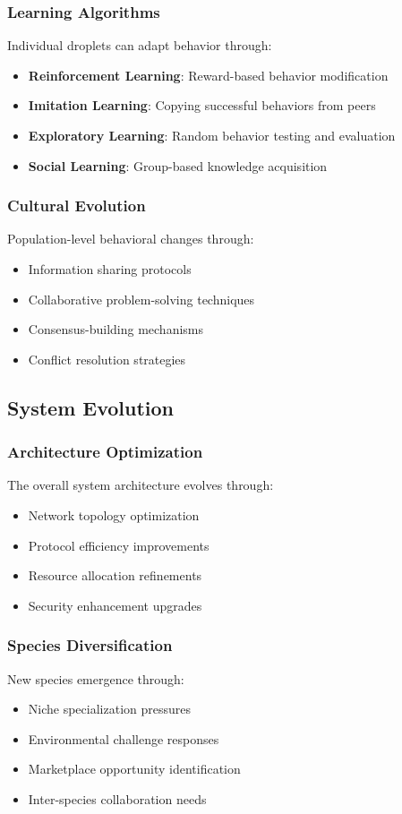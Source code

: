 \documentclass[11pt,a4paper]{article}
\begin{document}
\subsubsection{Learning Algorithms}
Individual droplets can adapt behavior through:
\begin{itemize}
    \item \textbf{Reinforcement Learning}: Reward-based behavior modification
    \item \textbf{Imitation Learning}: Copying successful behaviors from peers
    \item \textbf{Exploratory Learning}: Random behavior testing and evaluation
    \item \textbf{Social Learning}: Group-based knowledge acquisition
\end{itemize}

\subsubsection{Cultural Evolution}
Population-level behavioral changes through:
\begin{itemize}
    \item Information sharing protocols
    \item Collaborative problem-solving techniques
    \item Consensus-building mechanisms
    \item Conflict resolution strategies
\end{itemize}

\subsection{System Evolution}

\subsubsection{Architecture Optimization}
The overall system architecture evolves through:
\begin{itemize}
    \item Network topology optimization
    \item Protocol efficiency improvements
    \item Resource allocation refinements
    \item Security enhancement upgrades
\end{itemize}

\subsubsection{Species Diversification}
New species emergence through:
\begin{itemize}
    \item Niche specialization pressures
    \item Environmental challenge responses
    \item Marketplace opportunity identification
    \item Inter-species collaboration needs
\end{itemize}
\end{document}
